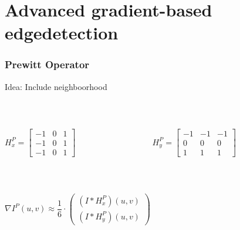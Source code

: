 
\section{Advanced gradient-based edgedetection}
\begin{frame}
	\frametitle{Prewitt Operator}
	\begin{center}
		Idea: Include neighboorhood
	\end{center}
	~\newline
	\begin{columns}
		\begin{column}{0.5\textwidth}
			\begin{center}
				$H^P_x = \begin{bmatrix}
				-1 & 0 & 1 \\ -1 & 0 & 1 \\ -1 & 0 & 1
				\end{bmatrix} $
			\end{center}	
		\end{column}
		\begin{column}{0.5\textwidth} 
			\begin{center}
				$H^P_y = \begin{bmatrix}
				-1 & -1 & -1 \\ 0 & 0 & 0 \\ 1 & 1 & 1
				\end{bmatrix} $
			\end{center}
		\end{column}
	\end{columns}
	~\newline
	\begin{center}
		$\nabla I^P(u,v)\approx \dfrac{1}{6} \cdot \begin{pmatrix}
		(I\ast H^P_x)(u,v) \\ (I\ast H^P_y)(u,v) 
		\end{pmatrix}$
	\end{center}
\end{frame}
